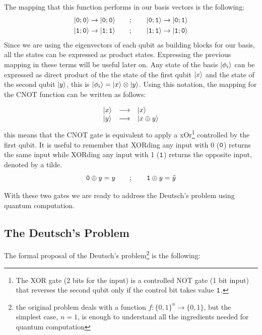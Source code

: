 The mapping that this function performs in our basis vectors is the following:
\begin{equation}
  \begin{split}
    &|\texttt{0};\texttt{0}\rangle\rightarrow|\texttt{0};\texttt{0}\rangle \qquad;\qquad
    |\texttt{0};\texttt{1}\rangle\rightarrow|\texttt{0};\texttt{1}\rangle\\
    &|\texttt{1};\texttt{0}\rangle\rightarrow|\texttt{1};\texttt{1}\rangle \qquad;\qquad
    |\texttt{1};\texttt{1}\rangle\rightarrow|\texttt{1};\texttt{0}\rangle
  \end{split}
\end{equation}
Since we are using the eigenvectors of each qubit as building blocks for our basis, all the states can be expressed as product states. Expressing the previous mapping in these terms will be useful later on.
Any state of the basis $|\phi_i\rangle$ can be expressed as direct product of the the state of the first qubit $|x\rangle$ and the state of the second qubit $|y\rangle$, this is  $|\phi_i\rangle=|x\rangle\otimes|y\rangle$.
Using this notation, the mapping for the CNOT function can be written as follows:

\begin{equation}
  \begin{array}{lcl}
    |x\rangle & \longrightarrow & |x\rangle \\
    |y\rangle & \longrightarrow & |x\oplus y\rangle
  \end{array}
\end{equation}
this means that the CNOT gate is equivalent to apply a \ac{xOr}\footnote{The XOR gate (2 bits for the input) is a controlled NOT gate (1 bit input) that reverses the second qubit only if the control bit takes value $\texttt{1}$.} controlled by the first qubit. It is useful to remember that XORding any input with 0 ($\texttt{0}$) returns the same input while XORding any input with 1 ($\texttt{1}$) returns the opposite input, denoted by a tilde.
\begin{equation}
  \texttt{0}\oplus y = y \qquad;\qquad \texttt{1}\oplus y = \tilde{y}
\end{equation}

With these two gates we are ready to address the Deutsch's problem using quantum computation.

\subsection{The Deutsch's Problem}
The formal proposal of the Deutsch's problem\footnote{the original problem deals with a function $f:\{ 0,1\}^n\rightarrow\{ 0,1\}$, but the simplest case, $n=1$, is enough to understand all the ingredients needed for quantum computation} is the following:\\

